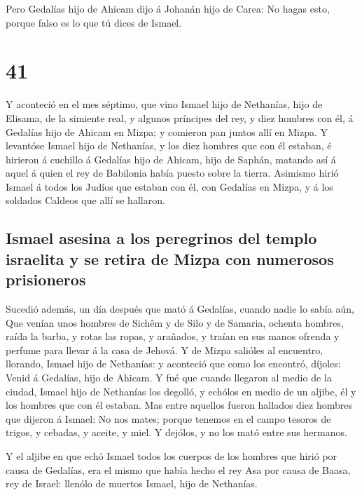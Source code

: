  Pero Gedalías hijo de Ahicam dijo á Johanán hijo de
Carea: No hagas esto, porque falso es lo que tú dices de Ismael.

\hypertarget{section-40}{%
\section{41}\label{section-40}}

 Y aconteció en el mes séptimo, que vino Ismael hijo de
Nethanías, hijo de Elisama, de la simiente real, y algunos príncipes del
rey, y diez hombres con él, á Gedalías hijo de Ahicam en Mizpa; y
comieron pan juntos allí en Mizpa.  Y levantóse Ismael
hijo de Nethanías, y los diez hombres que con él estaban, é hirieron á
cuchillo á Gedalías hijo de Ahicam, hijo de Saphán, matando así á aquel
á quien el rey de Babilonia había puesto sobre la tierra. 
Asimismo hirió Ismael á todos los Judíos que estaban con él, con
Gedalías en Mizpa, y á los soldados Caldeos que allí se hallaron.

\hypertarget{ismael-asesina-a-los-peregrinos-del-templo-israelita-y-se-retira-de-mizpa-con-numerosos-prisioneros}{%
\subsection{Ismael asesina a los peregrinos del templo israelita y se
retira de Mizpa con numerosos
prisioneros}\label{ismael-asesina-a-los-peregrinos-del-templo-israelita-y-se-retira-de-mizpa-con-numerosos-prisioneros}}

 Sucedió además, un día después que mató á Gedalías,
cuando nadie lo sabía aún,  Que venían unos hombres de
Sichêm y de Silo y de Samaria, ochenta hombres, raída la barba, y rotas
las ropas, y arañados, y traían en sus manos ofrenda y perfume para
llevar á la casa de Jehová.  Y de Mizpa salióles al
encuentro, llorando, Ismael hijo de Nethanías: y aconteció que como los
encontró, díjoles: Venid á Gedalías, hijo de Ahicam.  Y
fué que cuando llegaron al medio de la ciudad, Ismael hijo de Nethanías
los degolló, y echólos en medio de un aljibe, él y los hombres que con
él estaban.  Mas entre aquellos fueron hallados diez
hombres que dijeron á Ismael: No nos mates; porque tenemos en el campo
tesoros de trigos, y cebadas, y aceite, y miel. Y dejólos, y no los mató
entre sus hermanos.

 Y el aljibe en que echó Ismael todos los cuerpos de los
hombres que hirió por causa de Gedalías, era el mismo que había hecho el
rey Asa por causa de Baasa, rey de Israel: llenólo de muertos Ismael,
hijo de Nethanías.


